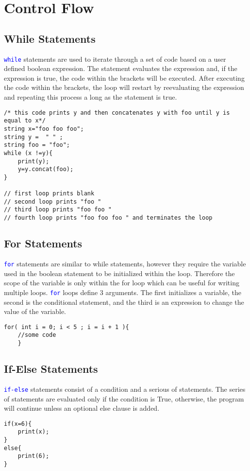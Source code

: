 \documentclass[12pt]{report}
\begin{document}
\section{Control Flow}
\subsection{While Statements}
\textcolor{blue}{\texttt{while}} statements are used to iterate through a set of code based on a user defined boolean expression. The statement evaluates the expression and, if the expression is true, the code within the brackets will be executed. After executing the code within the brackets, the loop will restart by reevaluating the expression and repeating this process a long as the statement is true. 
\begin{lstlisting}
/* this code prints y and then concatenates y with foo until y is equal to x*/
string x="foo foo foo"; 
string y =  " " ; 
string foo = "foo"; 
while (x !=y){
	print(y);
	y=y.concat(foo);
}

// first loop prints blank
// second loop prints "foo "
// third loop prints "foo foo "
// fourth loop prints "foo foo foo " and terminates the loop
\end{lstlisting}

\subsection{For Statements}
\textcolor{blue}{\texttt{for}} statements are similar to while statements, however they require the variable used in the boolean statement to be initialized within the loop. Therefore the scope of the variable is only within the for loop which can be useful for writing multiple loops. \textcolor{blue}{\texttt{for}} loops define 3 arguments. The first initializes a variable, the second is the conditional statement, and the third is an expression to change the value of the variable.
\begin{lstlisting}
for( int i = 0; i < 5 ; i = i + 1 ){
	//some code
	}	
\end{lstlisting}

\subsection{If-Else Statements}
\textcolor{blue}{\texttt{if-else}} statements consist of a condition and a serious of statements. The series of statements are evaluated only if the condition is True, otherwise, the program will continue unless an optional else clause is added. 
\begin{lstlisting}
if(x=6){
	print(x);
}
else{
	print(6);
}
\end{lstlisting}
\end{document}
